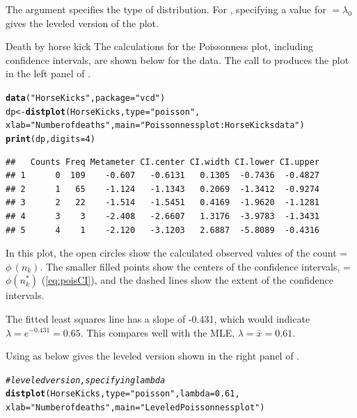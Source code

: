\documentclass[11pt]{book}\usepackage[]{graphicx}\usepackage[]{color}
\makeatletter
\newcommand{\hlnum}[1]{\textcolor[rgb]{0.686,0.059,0.569}{#1}}%
\newcommand{\hlstr}[1]{\textcolor[rgb]{0.192,0.494,0.8}{#1}}%
\newcommand{\hlcom}[1]{\textcolor[rgb]{0.678,0.584,0.686}{\textit{#1}}}%
\newcommand{\hlstd}[1]{\textcolor[rgb]{0.345,0.345,0.345}{#1}}%
\newcommand{\hlkwb}[1]{\textcolor[rgb]{0.69,0.353,0.396}{#1}}%
\newcommand{\hlkwc}[1]{\textcolor[rgb]{0.333,0.667,0.333}{#1}}%
\newcommand{\hlkwd}[1]{\textcolor[rgb]{0.737,0.353,0.396}{\textbf{#1}}}%
\newenvironment{kframe}{%
 \def\at@end@of@kframe{}%
 \ifinner\ifhmode%
  \def\at@end@of@kframe{\end{minipage}}%
  \begin{minipage}{\columnwidth}%
 \fi\fi%
 \def\FrameCommand##1{\hskip\@totalleftmargin \hskip-\fboxsep
 \colorbox{shadecolor}{##1}\hskip-\fboxsep
     \hskip-\linewidth \hskip-\@totalleftmargin \hskip\columnwidth}%
 \MakeFramed {\advance\hsize-\width
   \@totalleftmargin\z@ \linewidth\hsize
   \@setminipage}}%
 {\par\unskip\endMakeFramed%
 \at@end@of@kframe}
\newenvironment{knitrout}{}{} %
\renewenvironment{knitrout}{\small\renewcommand{\baselinestretch}{.85}}{} %
\makeatother
\begin{document}
The  argument specifies the type of distribution. For ,
specifying a value for  $=\lambda_0$ gives the leveled version of the
plot.

\begin{Example}[horsekick3]{Death by horse kick}
The calculations for the Poissonness plot, including confidence
intervals, are shown below for the  data.  The 
call to 
produces the plot in the left panel of
.  

\begin{knitrout}
\color{fgcolor}\begin{kframe}
\begin{alltt}
\hlkwd{data}\hlstd{(}\hlstr{"HorseKicks"}\hlstd{,} \hlkwc{package}\hlstd{=}\hlstr{"vcd"}\hlstd{)}
\hlstd{dp} \hlkwb{<-} \hlkwd{distplot}\hlstd{(HorseKicks,} \hlkwc{type} \hlstd{=} \hlstr{"poisson"}\hlstd{,}
  \hlkwc{xlab}\hlstd{=}\hlstr{"Number of deaths"}\hlstd{,} \hlkwc{main}\hlstd{=}\hlstr{"Poissonness plot: HorseKicks data"}\hlstd{)}
\hlkwd{print}\hlstd{(dp,} \hlkwc{digits}\hlstd{=}\hlnum{4}\hlstd{)}
\end{alltt}
\begin{verbatim}
##   Counts Freq Metameter CI.center CI.width CI.lower CI.upper
## 1      0  109    -0.607   -0.6131   0.1305  -0.7436  -0.4827
## 2      1   65    -1.124   -1.1343   0.2069  -1.3412  -0.9274
## 3      2   22    -1.514   -1.5451   0.4169  -1.9620  -1.1281
## 4      3    3    -2.408   -2.6607   1.3176  -3.9783  -1.3431
## 5      4    1    -2.120   -3.1203   2.6887  -5.8089  -0.4316
\end{verbatim}
\end{kframe}
\end{knitrout}

In this plot, the open circles show the calculated
observed values of the count  = $\phi \,  ( n_k )$.
The smaller filled points show the centers of the confidence intervals,
 = $\phi \left( n_k^{*}\right)$ (\eqref{eq:poisCI}),
and the dashed lines show the extent of the confidence intervals.

The fitted least squares line has a slope of -0.431, which would
indicate $\lambda = e^{-0.431} = 0.65$.  This compares well with the MLE,
$\lambda = \bar{x} = 0.61$.

Using  as below gives the leveled version shown in 
the right panel of .
\begin{knitrout}
\color{fgcolor}\begin{kframe}
\begin{alltt}
\hlcom{# leveled version, specifying lambda}
\hlkwd{distplot}\hlstd{(HorseKicks,} \hlkwc{type} \hlstd{=} \hlstr{"poisson"}\hlstd{,} \hlkwc{lambda} \hlstd{=} \hlnum{0.61}\hlstd{,}
  \hlkwc{xlab}\hlstd{=}\hlstr{"Number of deaths"}\hlstd{,} \hlkwc{main}\hlstd{=}\hlstr{"Leveled Poissonness plot"}\hlstd{)}
\end{alltt}
\end{kframe}
\end{knitrout}



\end{Example}
\end{document}
